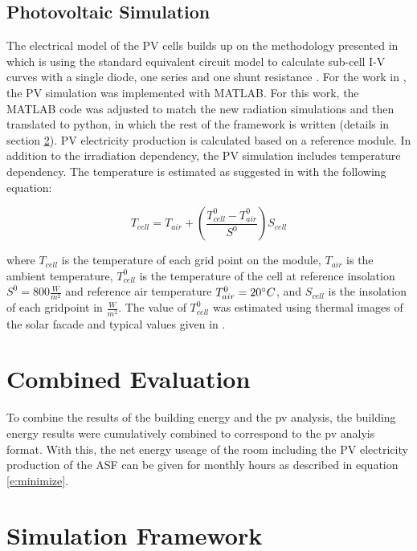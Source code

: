 		\subsection{Photovoltaic Simulation}
			The electrical model of the PV cells builds up on the methodology presented in \cite{hofer2015PVSEC} which is using the standard equivalent circuit model to calculate sub-cell I-V curves with a single diode, one series and one shunt resistance \cite{mermoud2010}. For the work in \cite{hofer2015PVSEC}, the PV simulation was implemented with MATLAB. For this work, the MATLAB code was adjusted to match the new radiation simulations and then translated to python, in which the rest of the framework is written (details in section \ref{s:simulationFramework}). PV electricity production is calculated based on a reference module. In addition to the irradiation dependency, the PV simulation includes temperature dependency. The temperature is estimated as suggested in \cite{Ross_Smokler_1986} with the following equation:

			\begin{equation}
				T_{cell} = T_{air} + \left(\frac{T_{cell}^0-T_{air}^0}{S^0}\right)S_{cell}
	      		\label{e:temp}
			\end{equation}

			where $T_{cell}$ is the temperature of each grid point on the module, $T_{air}$ is the ambient temperature, $T_{cell}^0$ is the temperature of the cell at reference insolation $S^0=800\frac{W}{m^2}$ and reference air temperature $T_{air}^0=20\degree C$, and $S_{cell}$ is the insolation of each gridpoint in $\frac{W}{m^2}$. The value of $T_{cell}^0$ was estimated using thermal images of the solar facade and typical values given in \cite{Ross_Smokler_1986}. 


	\section{Combined Evaluation}
		To combine the results of the building energy and the pv analysis, the building energy results were cumulatively combined to correspond to the pv analyis format. With this, the net energy useage of the room including the PV electricity production of the ASF can be given for monthly hours as described in equation \ref{e:minimize}. 

	\section{Simulation Framework}
	\label{s:simulationFramework}


